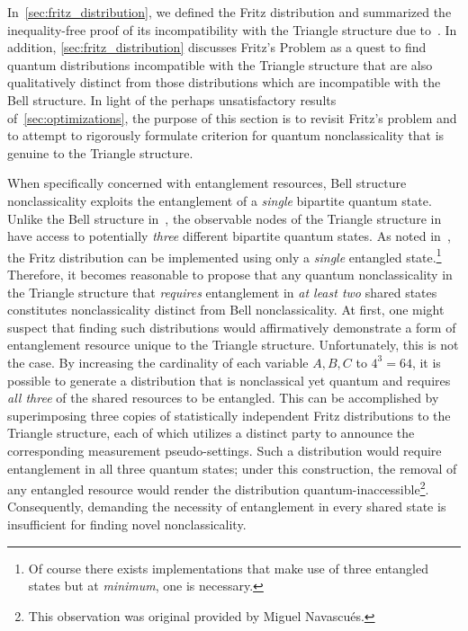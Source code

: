 \documentclass[aps, 10pt, english, twoside, pra, nofootinbib, tightenlines, longbibliography, superscriptaddress]{revtex4-1}
\begin{document}
    In~\cref{sec:fritz_distribution}, we defined the Fritz distribution and summarized the inequality-free proof of its incompatibility with the Triangle structure due to~\cite{Fritz_2012}. In addition, \cref{sec:fritz_distribution} discusses Fritz's Problem as a quest to find quantum distributions incompatible with the Triangle structure that are also qualitatively distinct from those distributions which are incompatible with the Bell structure. In light of the perhaps unsatisfactory results of~\cref{sec:optimizations}, the purpose of this section is to revisit Fritz's problem and to attempt to rigorously formulate criterion for quantum nonclassicality that is genuine to the Triangle structure.

    When specifically concerned with entanglement resources, Bell structure nonclassicality exploits the entanglement of a \textit{single} bipartite quantum state. Unlike the Bell structure in~, the observable nodes of the Triangle structure in~ have access to potentially \textit{three} different bipartite quantum states. As noted in~\cite{Fritz_2012}, the Fritz distribution can be implemented using only a \textit{single} entangled state.\footnote{Of course there exists implementations that make use of three entangled states but at \textit{minimum}, one is necessary.} Therefore, it becomes reasonable to propose that any quantum nonclassicality in the Triangle structure that \textit{requires} entanglement in \textit{at least two} shared states constitutes nonclassicality distinct from Bell nonclassicality. At first, one might suspect that finding such distributions would affirmatively demonstrate a form of entanglement resource unique to the Triangle structure. Unfortunately, this is not the case. By increasing the cardinality of each variable $A, B, C$ to $4^{3} = 64$, it is possible to generate a distribution that is nonclassical yet quantum and requires \textit{all three} of the shared resources to be entangled. This can be accomplished by superimposing three copies of statistically independent Fritz distributions to the Triangle structure, each of which utilizes a distinct party to announce the corresponding measurement pseudo-settings. Such a distribution would require entanglement in all three quantum states; under this construction, the removal of any entangled resource would render the distribution quantum-inaccessible\footnote{This observation was original provided by Miguel Navascués.}. Consequently, demanding the necessity of entanglement in every shared state is insufficient for finding novel nonclassicality.
\end{document}

